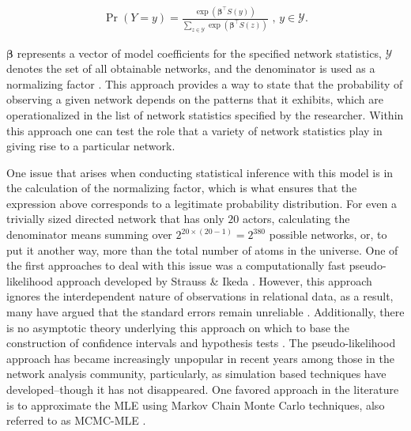 \documentclass[12pt,twocolumn,twoside]{pnas-new}
\begin{document}
\begin{align}
\Pr(Y = y) = \frac{ \exp( \bm\beta^{\top} S(y)  )  }{ \sum_{z \in \mathcal{Y}} \exp( \bm\beta^{\top} S(z)  )  } \text{ ,  } y \in \mathcal{Y}.
\label{eqn:ergm}
\end{align}

$\bm\beta$ represents a vector of model coefficients for the specified network statistics, $\mathcal{Y}$ denotes the set of all obtainable networks, and the denominator is used as a normalizing factor \citep{hunter:etal:2008}. This approach provides a way to state that the probability of observing a given network depends on the patterns that it exhibits, which are operationalized in the list of network statistics specified by the researcher. Within this approach one can test the role that a variety of network statistics play in giving rise to a particular network.

One issue that arises when conducting statistical inference with this model is in the calculation of the normalizing factor, which is what ensures that the expression above corresponds to a legitimate probability distribution. For even a trivially sized directed network that has only $20$ actors, calculating the denominator means summing over $2^{20\times(20-1)} = 2^{380}$ possible networks, or, to put it another way, more than the total number of atoms in the universe. One of the first approaches to deal with this issue was a computationally fast pseudo-likelihood approach developed by Strauss \& Ikeda \citep{strauss:ikeda:1990}. However, this approach ignores the interdependent nature of observations in relational data, as a result, many have argued that the standard errors remain unreliable \citep{vanduijn:etal:2009}. Additionally, there is no asymptotic theory underlying this approach on which to base the construction of confidence intervals and hypothesis tests \citep{kolaczyk:2009}. The pseudo-likelihood approach has became increasingly unpopular in recent years among those in the network analysis community, particularly, as simulation based techniques have developed--though it has not disappeared. One favored approach in the literature is to approximate the MLE using Markov Chain Monte Carlo techniques, also referred to as MCMC-MLE \citep{geyer:thompson:1992,snijders:2002,handcock:2003a}.
\end{document}
